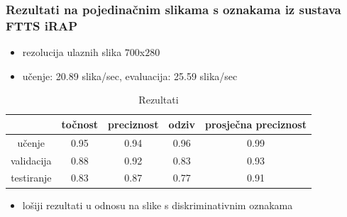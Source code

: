 \documentclass{beamer}
\begin{document}
\begin{frame}
 \frametitle{Rezultati na pojedinačnim slikama s oznakama iz sustava FTTS iRAP}
 \begin{itemize}
  \item rezolucija ulaznih slika $700$x$280$
  \item učenje: 20.89 slika/sec, evaluacija: 25.59 slika/sec
 \end{itemize}
 
\begin{table}[H]
\centering
\caption{Rezultati}
\label{score:single_irap}
\begin{tabular}{c|c|c|c|c|}
\cline{2-5}
                                            & točnost & preciznost & odziv & prosječna preciznost \\ \hline
\multicolumn{1}{|c|}{učenje}     & 0.95       & 0.94        & 0.96     &           0.99           \\ \hline
\multicolumn{1}{|c|}{validacija} & 0.88       & 0.92        & 0.83     &            0.93          \\ \hline
\multicolumn{1}{|c|}{testiranje} & 0.83       & 0.87        & 0.77     &            0.91          \\ \hline
\end{tabular}
\end{table}

\begin{itemize}
 \item lošiji rezultati u odnosu na slike s diskriminativnim oznakama
\end{itemize}

\end{frame}
\end{document}
